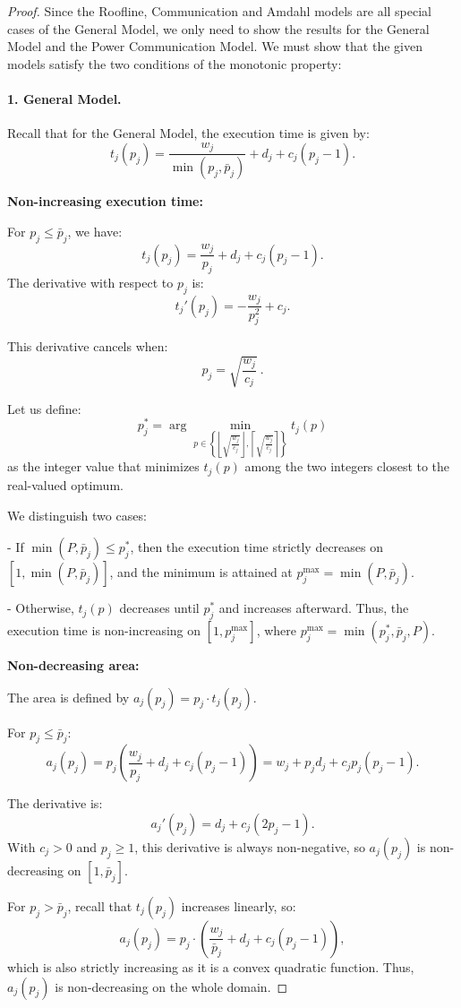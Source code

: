 \documentclass{article}
\begin{document}
\begin{proof}
Since the Roofline, Communication and Amdahl models are all special cases of the General Model, we only need to show the results for the General Model and the Power Communication Model.
We must show that the given models satisfy the two conditions of the monotonic property:



\paragraph{1. General Model.}
Recall that for the General Model, the execution time is given by:
\[
t_j(p_j) = \frac{w_j}{\min(p_j, \bar{p}_j)} + d_j + c_j(p_j - 1) .
\]

\textbf{Non-increasing execution time:}

For $p_j \leq \bar{p}_j$, we have:
\[
t_j(p_j) = \frac{w_j}{p_j} + d_j + c_j(p_j - 1) .
\]
The derivative with respect to $p_j$ is:
\[
t_j'(p_j) = -\frac{w_j}{p_j^2} + c_j .
\]

This derivative cancels when:
\[
p_j = \sqrt{\frac{w_j}{c_j}} \ .
\]

Let us define:
\[
p_j^* = \arg\min_{p \in \left\{\left\lfloor \sqrt{\frac{w_j}{c_j}} \right\rfloor, \left\lceil \sqrt{\frac{w_j}{c_j}} \right\rceil\right\}} t_j(p) 
\]
as the integer value that minimizes $t_j(p)$ among the two integers closest to the real-valued optimum.

We distinguish two cases:

- If $\min(P, \bar{p}_j) \leq p_j^*$, then the execution time strictly decreases on $[1, \min(P, \bar{p}_j)]$, and the minimum is attained at $p_j^{\max} = \min(P, \bar{p}_j)$.

- Otherwise, $t_j(p)$ decreases until $p_j^*$ and increases afterward. Thus, the execution time is non-increasing on $[1, p_j^{\max}]$, where $p_j^{\max} = \min\left(p_j^*, \bar{p}_j, P\right)$.


\textbf{Non-decreasing area:}

The area is defined by $a_j(p_j) = p_j \cdot t_j(p_j)$.

For $p_j \leq \bar{p}_j$:
\[
a_j(p_j) = p_j \left( \frac{w_j}{p_j} + d_j + c_j(p_j - 1) \right) = w_j + p_j d_j + c_j p_j(p_j - 1).
\]

The derivative is:
\[
a_j'(p_j) = d_j + c_j(2p_j - 1).
\]
With $c_j > 0$ and $p_j \geq 1$, this derivative is always non-negative, so $a_j(p_j)$ is non-decreasing on $[1, \bar{p}_j]$.

For $p_j > \bar{p}_j$, recall that $t_j(p_j)$ increases linearly, so:
\[
a_j(p_j) = p_j \cdot \left( \frac{w_j}{\bar{p}_j} + d_j + c_j(p_j - 1) \right)
,\]
which is also strictly increasing as it is a convex quadratic function. Thus, $a_j(p_j)$ is non-decreasing on the whole domain.


\end{proof}
\end{document}
